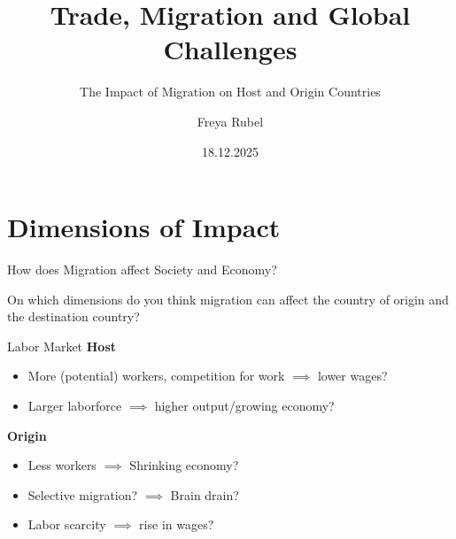 \documentclass{beamer}
\author{Freya Rubel}
\title{Trade, Migration and Global Challenges}
\subtitle{The Impact of Migration on Host and Origin Countries}
\institute{}
\date{18.12.2025}
\begin{document}
\begin{frame}
    \titlepage
\end{frame}

\begin{frame}
    \tableofcontents[sectionstyle=show, subsectionstyle=show/shaded/hide, subsubsectionstyle=show/shaded/hide]
\end{frame}

\section{Dimensions of Impact}

\begin{frame}{How does Migration affect Society and Economy?}
\begin{center}
\large
    On which dimensions do you think migration can affect the country of origin and the destination country?
\end{center}
\end{frame}

\begin{frame}{Labor Market}
    \textbf{Host}
\begin{itemize}
    \item More (potential) workers, competition for work $\implies$ lower wages?
    \item Larger laborforce $\implies$ higher output/growing economy?
\end{itemize}
    \textbf{Origin}
    \begin{itemize}
        \item Less workers $\implies$ Shrinking economy?
        \item Selective migration? $\implies$ Brain drain? %
        \item Labor scarcity $\implies$ rise in wages? %
    \end{itemize}
\end{frame}
\end{document}
